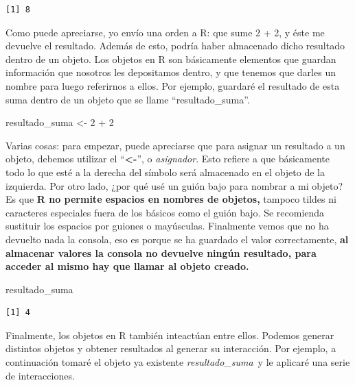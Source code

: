 \documentclass[
  letterpaper,
  DIV=11,
  numbers=noendperiod]{scrreprt}
\newenvironment{Shaded}{\begin{snugshade}}{\end{snugshade}}
\newcommand{\DecValTok}[1]{\textcolor[rgb]{0.68,0.00,0.00}{#1}}
\newcommand{\NormalTok}[1]{\textcolor[rgb]{0.00,0.23,0.31}{#1}}
\newcommand{\OtherTok}[1]{\textcolor[rgb]{0.00,0.23,0.31}{#1}}
\newcommand{\SpecialCharTok}[1]{\textcolor[rgb]{0.37,0.37,0.37}{#1}}
\begin{document}
\begin{verbatim}
[1] 8
\end{verbatim}

Como puede apreciarse, yo envío una orden a R: que sume 2 + 2, y éste me
devuelve el resultado. Además de esto, podría haber almacenado dicho
resultado dentro de un objeto. Los objetos en R son básicamente
elementos que guardan información que nosotros les depositamos dentro, y
que tenemos que darles un nombre para luego referirnos a ellos. Por
ejemplo, guardaré el resultado de esta suma dentro de un objeto que se
llame ``resultado\_suma''.

\begin{Shaded}
\begin{Highlighting}[]
\NormalTok{resultado\_suma }\OtherTok{\textless{}{-}} \DecValTok{2} \SpecialCharTok{+} \DecValTok{2}
\end{Highlighting}
\end{Shaded}

Varias cosas: para empezar, puede apreciarse que para asignar un
resultado a un objeto, debemos utilizar el ``\textbf{\textless-}'', o
\emph{asignador}. Esto refiere a que básicamente todo lo que esté a la
derecha del símbolo será almacenado en el objeto de la izquierda. Por
otro lado, ¿por qué usé un guión bajo para nombrar a mi objeto? Es que
\textbf{R no permite espacios en nombres de objetos,} tampoco tildes ni
caracteres especiales fuera de los básicos como el guión bajo. Se
recomienda sustituir los espacios por guiones o mayúsculas. Finalmente
vemos que no ha devuelto nada la consola, eso es porque se ha guardado
el valor correctamente, \textbf{al almacenar valores la consola no
devuelve ningún resultado, para acceder al mismo hay que llamar al
objeto creado.}

\begin{Shaded}
\begin{Highlighting}[]
\NormalTok{resultado\_suma}
\end{Highlighting}
\end{Shaded}

\begin{verbatim}
[1] 4
\end{verbatim}

Finalmente, los objetos en R también inteactúan entre ellos. Podemos
generar distintos objetos y obtener resultados al generar su
interacción. Por ejemplo, a continuación tomaré el objeto ya existente
\emph{resultado\_suma}~y le aplicaré una serie de interacciones.
\end{document}
